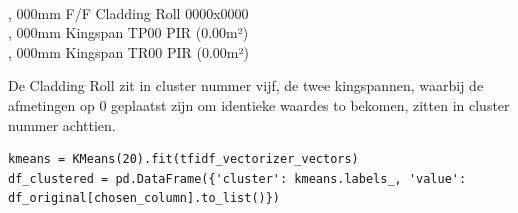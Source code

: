 \\ , 000mm F/F Cladding Roll 0000x0000
\\ , 000mm Kingspan TP00 PIR (0.00m²)
\\ , 000mm Kingspan TR00 PIR (0.00m²)

De Cladding Roll zit in cluster nummer vijf, de twee kingspannen, waarbij de afmetingen op 0 geplaatst zijn om identieke waardes to bekomen, zitten in cluster nummer achttien.

\begin{lstlisting}
kmeans = KMeans(20).fit(tfidf_vectorizer_vectors)
df_clustered = pd.DataFrame({'cluster': kmeans.labels_, 'value': df_original[chosen_column].to_list()})
\end{lstlisting}

\\\indent



